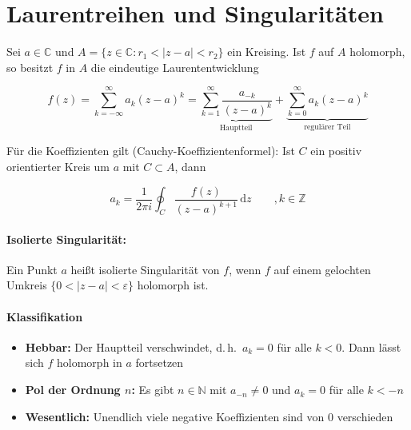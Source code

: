 \documentclass[a4paper,11pt,oneside,open=any,parskip=half, DIV=15]{scrreprt}
\begin{document}
\section{Laurentreihen und Singularitäten}

   Sei \(a\in\mathbb{C}\) und \(A=\{z\in\mathbb{C}: r_1<|z-a|<r_2\}\) ein Kreising.
   Ist \(f\) auf \(A\) holomorph, so besitzt \(f\) in \(A\) die eindeutige Laurententwicklung
   \begin{importantbox}
      \[
         f(z)=\sum_{k=-\infty}^{\infty} a_k (z-a)^k   %
               = \underbrace{\sum_{k=1}^{\infty} \frac{a_{-k}}{(z-a)^{k}}}_{\text{Hauptteil}}   %
               + \underbrace{\sum_{k=0}^{\infty} a_k (z-a)^k}_{\text{regulärer Teil}}  %
      \]
   \end{importantbox}

   \newpage

   Für die Koeffizienten gilt (Cauchy-Koeffizientenformel): Ist \(C\) ein positiv
   orientierter Kreis um \(a\) mit \(C\subset A\), dann
   \begin{importantbox}
      \[
         a_k=\frac{1}{2\pi i}\oint_C \frac{f(z)}{(z-a)^{k+1}}\,\mathrm{d}z \qquad ,k\in\mathbb{Z}  %
      \]
   \end{importantbox}

   \paragraph{Isolierte Singularität:}
   Ein Punkt \(a\) heißt isolierte Singularität von \(f\), wenn \(f\) auf einem gelochten
   Umkreis \(\{0<|z-a|<\varepsilon\}\) holomorph ist.

   \paragraph{Klassifikation}
   \begin{itemize}
      \item \textbf{Hebbar:} Der Hauptteil verschwindet, d.\,h.\ \(a_k=0\) für alle \(k<0\).
            Dann lässt sich \(f\) holomorph in \(a\) fortsetzen
      \item \textbf{Pol der Ordnung \(n\):} Es gibt \(n\in\mathbb{N}\) mit \(a_{-n}\neq 0\) und
            \(a_k=0\) für alle \(k<-n\)
      \item \textbf{Wesentlich:} Unendlich viele negative Koeffizienten sind von \(0\) verschieden
   \end{itemize}
\end{document}

